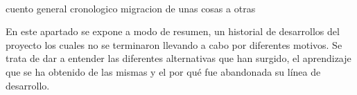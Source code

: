 \paragraph{}
cuento general cronologico migracion de unas cosas a otras

En este apartado se expone a modo de resumen, un historial de desarrollos del proyecto los cuales no se terminaron llevando a cabo por diferentes motivos. 
Se trata de dar a entender las diferentes alternativas que han surgido, el aprendizaje que se ha obtenido de las mismas y el por qué fue abandonada su línea de desarrollo.
